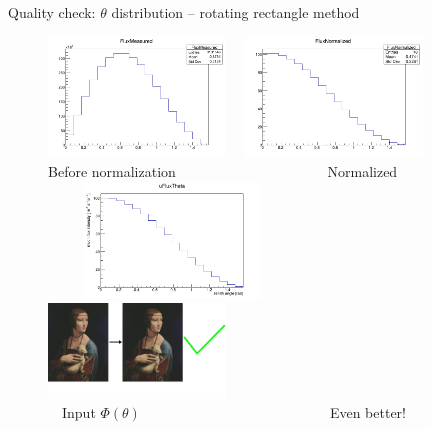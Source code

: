 \documentclass{beamer}
\begin{document}
\begin{frame}{Quality check: $\theta$ distribution -- rotating rectangle method}
\begin{figure}
\includegraphics[width=0.42\textwidth]{images/FluxMeasured.png}~~
\includegraphics[width=0.42\textwidth]{images/FluxNormalized.png}\\
Before normalization~~~~~~~~~~~~~~~~~~~~~ Normalized~~~~~\\
~~~~~\includegraphics[width=0.42\textwidth]{images/uFLuxTheta.png}
~~~~~~~\includegraphics[width=0.42\textwidth]{images/Lady_with_an_Ermine_good.jpg}\\
~~Input $\Phi(\theta)$~~~~~~~~~~~~~~~~~~~~~~~~~~~Even better!
\end{figure}
\end{frame}
\end{document}
